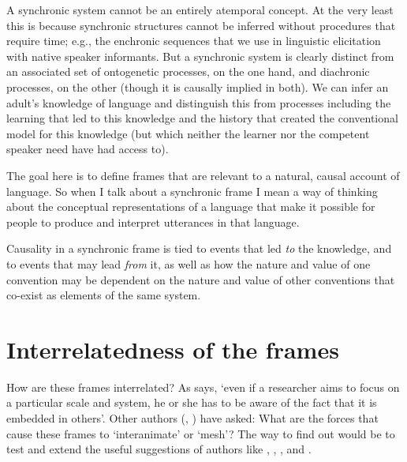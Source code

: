 A synchronic system cannot be an entirely atemporal concept. At the very 
least this is because synchronic structures cannot be inferred without 
procedures that require time; e.g., the enchronic sequences that we use
in linguistic elicitation with native speaker informants. But a synchronic system is 
clearly distinct from an associated set of ontogenetic processes, on the one hand, 
and diachronic processes, on the other (though it is causally 
implied in both). We can infer an adult's knowledge of language and 
distinguish this from processes including the learning that led to this 
knowledge and the history that created the conventional model for 
this knowledge (but which neither the learner nor the competent speaker 
need have had access to). 



The goal here is to define frames that are relevant to a natural, causal account of language. So when I talk about a 
synchronic frame I mean a way of thinking about the conceptual representations of a language that make it possible for people to produce and interpret utterances in that language. 



Causality in a synchronic frame is tied to events that led \textit{to} 
the knowledge, and to events that may lead \textit{from} it, as well as how the 
nature and value of one convention may be dependent on the nature and 
value of other conventions that co-exist as elements of the same system.



\section{Interrelatedness of the frames}



How are these frames interrelated? As \citet[276]{raczaszek-leonardi_multiple_2010} says, \textquoteleft even if a researcher aims to focus on a particular scale and system, he 
or she has to be aware of the fact that it is embedded in others'. Other 
authors (\citealt[179]{cole_cultural_1996}, \citealt[192]{macwhinney_emergence_2005}) have asked: What are the 
forces that cause these frames to \textquoteleft interanimate' or \textquoteleft mesh'? The way to find out would be to test and extend the useful suggestions of authors like \citet{newell_unified_1990}, \citet[184--185]{cole_cultural_1996}, \citet{macwhinney_emergence_2005}, \citet[279--286]{lemke_across_2000} and \citet{uryu_ecology_2014}. 




